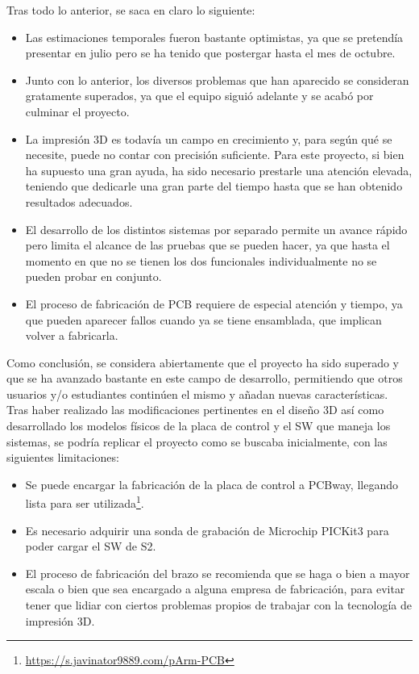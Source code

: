 Tras todo lo anterior, se saca en claro lo siguiente:
\begin{itemize}
    \item Las estimaciones temporales fueron bastante optimistas, ya que se pretendía
    presentar en julio pero se ha tenido que postergar hasta el mes de octubre.

    \item Junto con lo anterior, los diversos problemas que han aparecido se consideran
    gratamente superados, ya que el equipo siguió adelante y se acabó por culminar el
    proyecto.

    \item La impresión 3D es todavía un campo en crecimiento y, para según qué se
    necesite, puede no contar con precisión suficiente. Para este proyecto, si bien
    ha supuesto una gran ayuda, ha sido necesario prestarle una atención elevada,
    teniendo que dedicarle una gran parte del tiempo hasta que se han obtenido resultados
    adecuados.

    \item El desarrollo de los distintos sistemas por separado permite un avance rápido
    pero limita el alcance de las pruebas que se pueden hacer, ya que hasta el momento en
    que no se tienen los dos funcionales individualmente no se pueden probar en conjunto.

    \item El proceso de fabricación de \ac{PCB} requiere de especial atención y tiempo,
    ya que pueden aparecer fallos cuando ya se tiene ensamblada, que implican volver a
    fabricarla.
\end{itemize}

Como conclusión, se considera abiertamente que el proyecto  ha sido superado y que se ha avanzado
bastante en este campo de desarrollo, permitiendo que otros usuarios y/o estudiantes
continúen el mismo y añadan nuevas características. Tras haber realizado las
modificaciones pertinentes en el diseño 3D así como desarrollado los modelos físicos
de la placa de control y el \ac{SW} que maneja los sistemas, se podría replicar
el proyecto como se buscaba inicialmente, con las siguientes limitaciones:
\begin{itemize}
    \item Se puede encargar la fabricación de la placa de control a PCBway,
    llegando lista para ser utilizada\footnote{\url{https://s.javinator9889.com/pArm-PCB}
    \qquad {}}.

    \item Es necesario adquirir una sonda de grabación de Microchip PICKit3 para
    poder cargar el \ac{SW} de \ac{S2}.

    \item El proceso de fabricación del brazo se recomienda que se haga o bien a
    mayor escala o bien que sea encargado a alguna empresa de fabricación, para
    evitar tener que lidiar con ciertos problemas propios de trabajar con
    la tecnología de impresión 3D.
\end{itemize}

